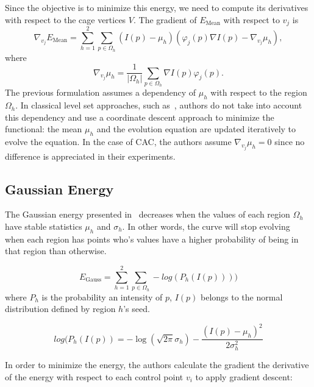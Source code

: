 Since the objective is to minimize this energy, we need to
compute its derivatives with respect to the cage vertices $V$.
The gradient of $E_{\mathrm{Mean}}$ with respect to $v_j$ is
\begin{displaymath}
\nabla_{v_j} {E_{\mathrm{Mean}}}=\sum_{h=1}^2 \sum_{p \in \Omega_{h}} (I(p)-\mu_h)  (\varphi_j(p) \nabla I(p) - \nabla_{v_j} \mu_h),
\end{displaymath}
where
\begin{equation}
\nabla_{v_j} \mu_h = \frac{1}{|\Omega_h|}\sum_{p \in\Omega_h} \nabla I(p)\varphi_j(p).
\label{equ:derivative_mean}
\end{equation}
The previous formulation assumes a dependency of $\mu_h$ with respect to the
region $\Omega_h$. In classical level set approaches, such as~\cite{ChanVese},
authors do not take into account this dependency and use a coordinate descent
approach to minimize the functional: the mean $\mu_h$ and the evolution
equation are updated iteratively to evolve the equation. In the case of CAC, the authors
assume $\nabla_{v_j} \mu_h = 0$ since no difference is appreciated in their experiments.

\subsection{Gaussian Energy}
\label{subsubsec:gaussian}

The Gaussian energy presented in~\cite{ipcac2015} decreases when the values of each region $\Omega_h$ have stable statistics $\mu_h$ and $\sigma_h$. In other words, the curve will stop evolving when each region has points who's values have a higher probability of being in that region than otherwise. 

\begin{equation}
E_{\mathrm{Gauss}}=\sum\limits_{h =1}^{2} \sum_{p \in \Omega_h} -log(P_h(I(p))))
\end{equation}
where $P_h$ is the probability an intensity of $p$, $I(p)$ belongs to the normal distribution defined by region $h$'s seed.

\begin{equation}
	log(P_h(I(p))=-\log(\sqrt{2\pi}\sigma_h)-\frac{(I(p)-\mu_h)^2}{2\sigma_h^2}
\end{equation}



In order to minimize the energy, the authors calculate the gradient the derivative of the energy with respect to each control point $v_i$ to apply gradient descent:

